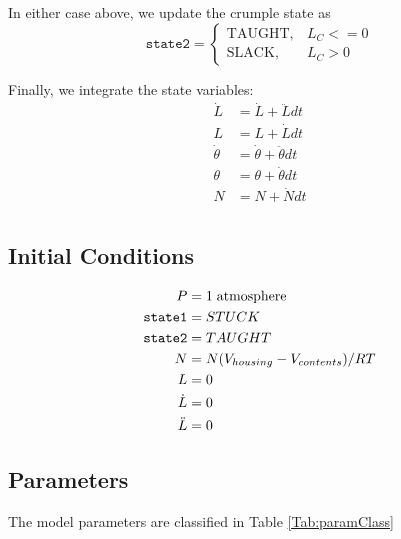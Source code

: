 \documentclass[letterpaper]{article}
\begin{document}
In either case above, we update the crumple state as
\begin{equation}
    \mathtt{state2} =
    \begin{cases}
      \mathrm{TAUGHT},  &  L_C <=0 \\
      \mathrm{SLACK},   &  L_C  > 0
    \end{cases}
\end{equation}

Finally, we integrate the state variables:
\begin{equation}
\begin{aligned}
  \dot{L} &= \dot{L} +  \ddot{L}  dt \\
  L       &= L + \dot{L}  dt \\
  \dot{\theta} &= \dot{\theta} + \ddot{\theta}dt \\
  \theta &= \theta + \dot{\theta} dt\\
  N &= N + \dot{N}  dt\\
\end{aligned}
\end{equation}


\subsection{Initial Conditions}
\begin{equation}
\begin{aligned}
  P &= 1 \; \mathrm{atmosphere}\\
  {\tt state1} &= STUCK \\
  {\tt state2} &= TAUGHT \\
  N &= N(V_{housing} - V_{contents}) / RT \\
  L &= 0\\
  \dot{L} &= 0\\
  \ddot{L} &= 0\\
\end{aligned}
\end{equation}

\subsection{Parameters}
The model parameters are classified in Table \ref{Tab:paramClass}
\end{document}
